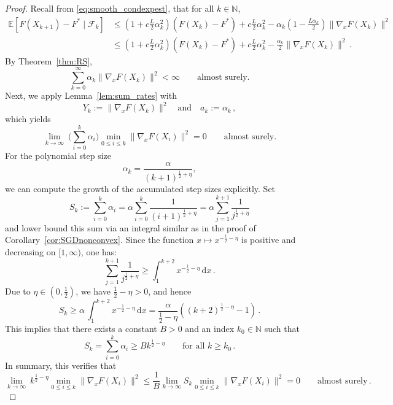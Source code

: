 \documentclass[12pt,openany]{book}
\theoremstyle{definition}
\theoremstyle{definition}
\newcommand{\cF}{\mathcal{F}}
\newcommand{\E}{\mathbb{E}}
\newcommand{\N}{\mathbb{N}}
\begin{document}
\begin{proof}
Recall from \eqref{eq:smooth_condexpest}, that for all $k\in\N$, 
\begin{align*} 
\E[F(X_{k+1})-F^\ast\mid\cF_k] &\le (1+c\frac{L}2\alpha_k^2) (F(X_k)-F^\ast)+c\frac{L}{2}\alpha_k^2 - \alpha_k(1-\frac{L\alpha_k}{2})\|\nabla_xF(X_k)\|^2\\
&\le (1+c\frac{L}2\alpha_k^2) (F(X_k)-F^\ast)+c\frac{L}{2}\alpha_k^2 - \frac{\alpha_k}2\|\nabla_xF(X_k)\|^2\,.
\end{align*}
By Theorem~\ref{thm:RS},
\[
\sum_{k=0}^{\infty}
\alpha_k\|\nabla_xF(X_k)\|^2
<\infty
\qquad \text{almost surely}.
\]
Next, we apply Lemma~\ref{lem:sum_rates} with
\[
Y_k:=\|\nabla_xF(X_k)\|^2
\quad\text{and}\quad
a_k:=\alpha_k\,,
\]
which yields
\[
\lim_{k\to\infty}\ \Big(\sum_{i=0}^{k}\alpha_i\Big)\min_{0\leq i\leq k}\|\nabla_xF(X_i)\|^2
=
0
\qquad \text{almost surely}.
\]
For the polynomial step size
\[
\alpha_k=\frac{\alpha}{(k+1)^{\frac12+\eta}},
\]
we can compute the growth of the accumulated step sizes explicitly. Set
\[
S_k:=\sum_{i=0}^{k}\alpha_i
=
\alpha \sum_{i=0}^{k}\frac{1}{(i+1)^{\frac12+\eta}}
=
\alpha \sum_{j=1}^{k+1}\frac{1}{j^{\frac12+\eta}}
\]
and lower bound this sum via an integral similar as in the proof of Corollary~\ref{cor:SGDnonconvex}.
Since the function $x\mapsto x^{-\frac12-\eta}$ is positive and decreasing on $[1,\infty)$, one has:
\[
\sum_{j=1}^{k+1}\frac{1}{j^{\frac12+\eta}}
\geq
\int_{1}^{k+2} x^{-\frac12-\eta}\,{\mathrm d}x\,.
\]
Due to $\eta\in(0,\tfrac12)$, we have $\frac12-\eta>0$, and hence
\[
S_k \ge \alpha\,\int_{1}^{k+2} x^{-\frac12-\eta}\,{\mathrm d}x
=
\frac{\alpha}{\frac12-\eta}
\left((k+2)^{\frac12-\eta}-1\right)\,.
\] 
This implies that there exists a constant $B>0$ and an index $k_0\in\mathbb{N}$ such that
\[S_k=\sum_{i=0}^{k}\alpha_i\geq B k^{\frac12-\eta} \qquad \text{for all } k\geq k_0\,. \]
In summary, this verifies that
\[\lim_{k\to\infty}\ k^{\frac12-\eta}\min_{0\leq i\leq k}\|\nabla_xF(X_i)\|^2
\le \frac{1}{B}\lim_{k\to\infty} S_k \min_{0\leq i\leq k}\|\nabla_xF(X_i)\|^2 = 0
\qquad \text{almost surely}\,.
\]
\end{proof}
\end{document}
